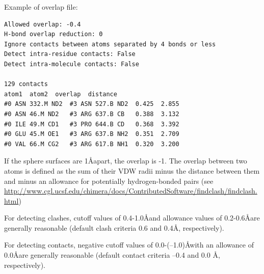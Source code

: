 \documentclass[12pt]{article} %
\begin{document}
Example of overlap file:
\begin{verbatim}
Allowed overlap: -0.4
H-bond overlap reduction: 0
Ignore contacts between atoms separated by 4 bonds or less
Detect intra-residue contacts: False
Detect intra-molecule contacts: False

129 contacts
atom1  atom2  overlap  distance
#0 ASN 332.M ND2  #3 ASN 527.B ND2  0.425  2.855
#0 ASN 46.M ND2   #3 ARG 637.B CB   0.388  3.132
#0 ILE 49.M CD1   #3 PRO 644.B CD   0.368  3.392
#0 GLU 45.M OE1   #3 ARG 637.B NH2  0.351  2.709
#0 VAL 66.M CG2   #3 ARG 617.B NH1  0.320  3.200

\end{verbatim}

If the sphere surfaces are 1\AA apart, the  overlap is -1. The overlap between two atoms is defined as the sum of their VDW radii minus the distance between them and minus an allowance for potentially hydrogen-bonded pairs (see \url{http://www.cgl.ucsf.edu/chimera/docs/ContributedSoftware/findclash/findclash.html})

For detecting clashes, cutoff values of 0.4-1.0\AA and allowance values of 0.2-0.6\AA are generally reasonable (default clash criteria 0.6 and 0.4\AA, respectively).

For detecting contacts, negative cutoff values of 0.0-(–1.0)\AA with an allowance of 0.0\AA are generally reasonable (default contact criteria –0.4 and 0.0 Å, respectively).


\newpage
\appendix 
\end{document}
